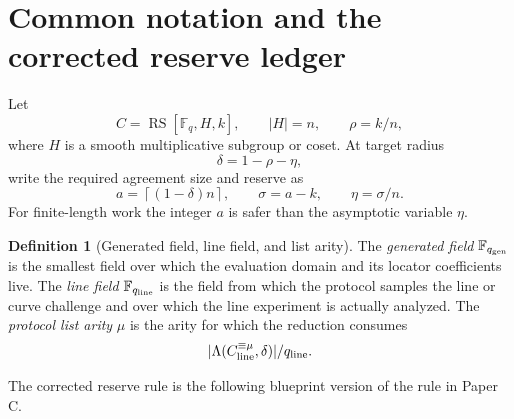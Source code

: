 \documentclass[11pt]{article}
\theoremstyle{definition}
\newtheorem{definition}[theorem]{Definition}
\theoremstyle{remark}
\newcommand{\F}{\mathbb F}
\newcommand{\RS}{\operatorname{RS}}
\newcommand{\Int}[2]{#1^{\equiv #2}}
\newcommand{\qgen}{q_{\rm gen}}
\newcommand{\qline}{q_{\rm line}}
\newcommand{\ceil}[1]{\left\lceil #1\right\rceil}
\newcommand{\paperC}{Paper C}
\begin{document}
\section{Common notation and the corrected reserve ledger}

Let
\[
        C=\RS[\F_q,H,k],\qquad |H|=n,\qquad \rho=k/n,
\]
where $H$ is a smooth multiplicative subgroup or coset.  At target radius
\[
        \delta=1-\rho-\eta,
\]
write the required agreement size and reserve as
\[
        a=\ceil{(1-\delta)n},\qquad \sigma=a-k,
        \qquad \eta=\sigma/n.
\]
For finite-length work the integer $a$ is safer than the asymptotic variable $\eta$.

\begin{definition}[Generated field, line field, and list arity]
\label{def:fields}
The \emph{generated field} $\F_{\qgen}$ is the smallest field over which the evaluation domain and its locator coefficients live.  The \emph{line field} $\F_{\qline}$ is the field from which the protocol samples the line or curve challenge and over which the line experiment is actually analyzed.  The \emph{protocol list arity} $\mu$ is the arity for which the reduction consumes
\[
        |\Lambda(\Int{C_{\rm line}}{\mu},\delta)|/\qline.
\]
\end{definition}

The corrected reserve rule is the following blueprint version of the rule in \paperC.
\end{document}
